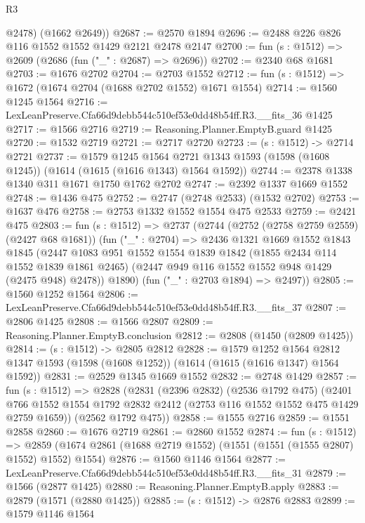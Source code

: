 \begin{lexlean}{R3}
\begin{coremodule}
        @2478)
      (@1662 @2649))
@2687 := @2570 @1894
@2696 := @2488 @226 @826 @116 @1552 @1552 @1429 @2121 @2478 @2147
@2700 := fun (s : @1512) => @2609 (@2686 (fun ("_" : @2687) => @2696))
@2702 := @2340 @68 @1681
@2703 := @1676 @2702
@2704 := @2703 @1552
@2712 := fun (s : @1512) => @1672 (@1674 @2704 (@1688 @2702 @1552) @1671 @1554)
@2714 := @1560 @1245 @1564
@2716 := LexLeanPreserve.Cfa66d9debb544c510ef53e0dd48b54ff.R3.__fits_36 @1425
@2717 := @1566 @2716
@2719 := Reasoning.Planner.EmptyB.guard @1425
@2720 := @1532 @2719
@2721 := @2717 @2720
@2723 := (s : @1512) -> @2714 @2721
@2737 := @1579
    @1245
    @1564
    @2721
    @1343
    @1593
    (@1598 (@1608 @1245))
    (@1614 (@1615 (@1616 @1343) @1564 @1592))
@2744 := @2378 @1338 @1340 @311 @1671 @1750 @1762 @2702
@2747 := @2392 @1337 @1669 @1552
@2748 := @1436 @475
@2752 := @2747 (@2748 @2533) (@1532 @2702)
@2753 := @1637 @476
@2758 := @2753 @1332 @1552 @1554 @475 @2533
@2759 := @2421 @475
@2803 := fun (s : @1512) =>
  @2737
    (@2744
      (@2752 (@2758 @2759 @2559) (@2427 @68 @1681))
      (fun ("_" : @2704) =>
      @2436
        @1321
        @1669
        @1552
        @1843
        @1845
        (@2447
          @1083
          @951
          @1552
          @1554
          @1839
          @1842
          (@1855 @2434 @114 @1552 @1839 @1861 @2465)
          (@2447 @949 @116 @1552 @1552 @948 @1429 (@2475 @948) @2478))
        @1890)
      (fun ("_" : @2703 @1894) => @2497))
@2805 := @1560 @1252 @1564
@2806 := LexLeanPreserve.Cfa66d9debb544c510ef53e0dd48b54ff.R3.__fits_37
@2807 := @2806 @1425
@2808 := @1566 @2807
@2809 := Reasoning.Planner.EmptyB.conclusion
@2812 := @2808 (@1450 (@2809 @1425))
@2814 := (s : @1512) -> @2805 @2812
@2828 := @1579
    @1252
    @1564
    @2812
    @1347
    @1593
    (@1598 (@1608 @1252))
    (@1614 (@1615 (@1616 @1347) @1564 @1592))
@2831 := @2529 @1345 @1669 @1552
@2832 := @2748 @1429
@2857 := fun (s : @1512) =>
  @2828
    (@2831
      (@2396 @2832)
      (@2536 @1792 @475)
      (@2401 @766 @1552 @1554 @1792 @2832 @2412 (@2753 @116 @1552 @1552 @475 @1429 @2759 @1659))
      (@2562 @1792 @475))
@2858 := @1555 @2716
@2859 := @1551 @2858
@2860 := @1676 @2719
@2861 := @2860 @1552
@2874 := fun (s : @1512) =>
  @2859 (@1674 @2861 (@1688 @2719 @1552) (@1551 (@1551 (@1555 @2807) @1552) @1552) @1554)
@2876 := @1560 @1146 @1564
@2877 := LexLeanPreserve.Cfa66d9debb544c510ef53e0dd48b54ff.R3.__fits_31
@2879 := @1566 (@2877 @1425)
@2880 := Reasoning.Planner.EmptyB.apply
@2883 := @2879 (@1571 (@2880 @1425))
@2885 := (s : @1512) -> @2876 @2883
@2899 := @1579
    @1146
    @1564

\end{coremodule}
\end{lexlean}
